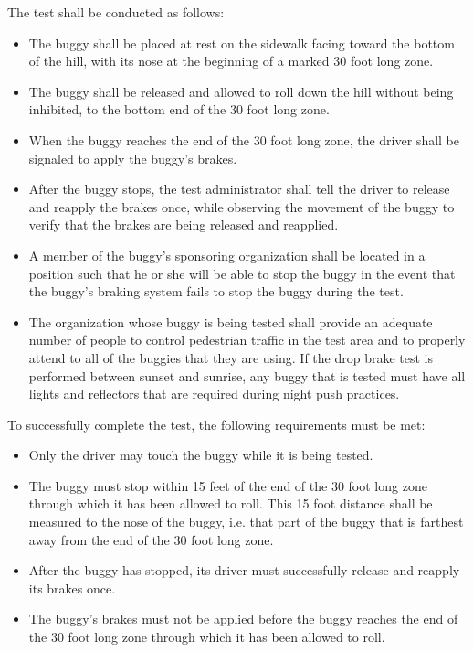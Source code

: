 The test shall be conducted as follows:
\begin{itemize}
	\item The buggy shall be placed at rest on the sidewalk facing toward the bottom of the hill, with its nose at the beginning of a marked 30 foot long zone.

	\item The buggy shall be released and allowed to roll down the hill without being inhibited, to the bottom end of the 30 foot long zone.
 
	\item When the buggy reaches the end of the 30 foot long zone, the driver shall be signaled to apply the buggy's brakes.
 
	\item After the buggy stops, the test administrator shall tell the driver to release and reapply the brakes once, while observing the movement of the buggy to verify that the brakes are being released and reapplied.
 
	\item A member of the buggy's sponsoring organization shall be located in a position such that he or she will be able to stop the buggy in the event that the buggy's braking system fails to stop the buggy during the test.
 
	\item The organization whose buggy is being tested shall provide an adequate number of people to control pedestrian traffic in the test area and to properly attend to all of the buggies that they are using. If the drop brake test is performed between sunset and sunrise, any buggy that is tested must have all lights and reflectors that are required during night push practices.
\end{itemize}

To successfully complete the test, the following requirements must be met:
\begin{itemize}
	\item Only the driver may touch the buggy while it is being tested.
 
	\item The buggy must stop within 15 feet of the end of the 30 foot long zone through which it has been allowed to roll. This 15 foot distance shall be measured to the nose of the buggy, i.e. that part of the buggy that is farthest away from the end of the 30 foot long zone.
 
	\item After the buggy has stopped, its driver must successfully release and reapply its brakes once.
 
	\item The buggy's brakes must not be applied before the buggy reaches the end of the 30 foot long zone through which it has been allowed to roll.
\end{itemize}

